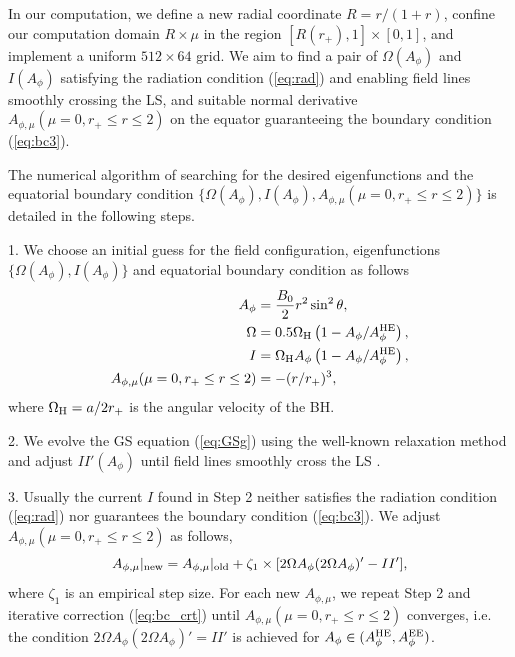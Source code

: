 \documentclass[aps,prd,reprint,nofootinbib, superscriptaddress]{revtex4-1}
\def\sst{\sin^2\theta}
\def\Ap{A_\phi}
\def\Am{A_{\phi,\mu}}
\def\be{\begin{equation}}
\def\ee{\end{equation}}
\def\WH{\Omega_{\rm H}}
\def\AHE{A_\phi^{\rm HE}}
\begin{document}
In our computation, we define a new radial coordinate $R=r/(1+r)$, confine our
computation domain $R\times \mu$ in the region $[R(r_+), 1]\times [0,1]$,
and implement a uniform $512\times 64$ grid.
We aim to find a pair of $\Omega(A_\phi)$ and $I(A_\phi)$ satisfying the radiation condition (\ref{eq:rad})
and enabling field lines smoothly crossing the LS,
and suitable normal derivative $\Am(\mu =0, r_+\leq r \leq 2)$ on the equator
guaranteeing the boundary condition (\ref{eq:bc3}).

The numerical algorithm of searching for the desired eigenfunctions and the equatorial
boundary condition $\{\Omega(A_\phi), I(A_\phi), \Am(\mu =0, r_+\leq r \leq 2)\}$
is detailed in the following steps.

1. We choose an initial guess for the field configuration, eigenfunctions
$\{ \Omega(\Ap), I(\Ap)\}$
and equatorial boundary condition  as follows
\begin{subequations}
\begin{align}
    \Ap &= \frac{B_0}{2}r^2 \sst,  \label{eq:gss1} \\
    \Omega & = 0.5\WH\left(1-\Ap/\AHE\right),  \label{eq:gss2}\\
    I & = \WH \Ap\left(1-\Ap/\AHE\right) , \\
    \Am(\mu =0, r_+\leq r \leq 2) & = - (r/r_+)^3, \label{eq:gss3}
\end{align}
\end{subequations}
where $\WH = a/2r_+$ is the angular velocity of the BH.

2. We evolve the GS equation (\ref{eq:GSg}) using the well-known relaxation method \cite{Press1987}
 and adjust $II'(\Ap)$ until  field lines smoothly cross the LS
\cite[see e.g.][for more details]{Contopoulos2013, Nathanail2014, Pan2017, Mahlmann2018}.

3. Usually the current $I$ found in Step 2 neither satisfies the radiation condition (\ref{eq:rad})
nor guarantees the boundary condition (\ref{eq:bc3}). We  adjust
$\Am(\mu = 0, r_+ \leq r\leq 2)$ as follows,
\be
\label{eq:bc_crt}
 A_{\phi,\mu}|_{\rm new}  = A_{\phi,\mu}|_{\rm old} + \zeta_1\times[2\Omega\Ap(2\Omega\Ap)' -II'],
\ee
where $\zeta_1$ is an empirical step size. For each new $A_{\phi,\mu}$, we repeat Step 2 and iterative
correction (\ref{eq:bc_crt}) until $\Am(\mu = 0, r_+ \leq r\leq 2)$ converges, i.e. the condition $2\Omega\Ap(2\Omega\Ap)' = II'$ is
achieved for $A_\phi\in (A_\phi^{\rm HE}, A_\phi^{\rm EE})$.
\end{document}
